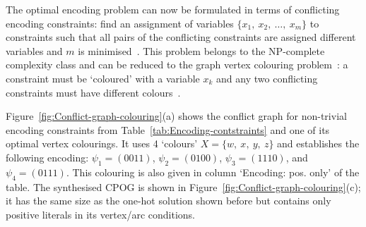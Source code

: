 The optimal encoding problem can now be formulated in terms of conflicting
encoding constraints: find an assignment of variables $\{x_{1},\ x_{2},\ \dots,\ x_{m}\}$
to constraints such that all pairs of the conflicting constraints
are assigned different variables and $m$ is minimised~\cite{2009_mokhov_phd}.
This problem belongs to the NP-complete complexity class and can be
reduced to the graph vertex colouring problem~\cite{2001_cormen_mit}:
a constraint must be `coloured' with a variable $x_{k}$ and any
two conflicting constraints must have different colours~\cite{2009_mokhov_phd}.

Figure~\ref{fig:Conflict-graph-colouring}(a) shows the conflict
graph for non-trivial encoding constraints from Table~\ref{tab:Encoding-contstraints}
and one of its optimal vertex colourings. It uses 4 `colours' $X=\{w,\ x,\ y,\ z\}$
and establishes the following encoding: $\psi_{1}=(0011)$, $\psi_{2}=(0100)$,
$\psi_{3}=(1110)$, and $\psi_{4}=(0111)$. This colouring is also
given in column `Encoding: pos. only' of the table. The synthesised
CPOG is shown in Figure~\ref{fig:Conflict-graph-colouring}(c); it
has the same size as the one-hot solution shown before but contains
only positive literals in its vertex/arc conditions.

